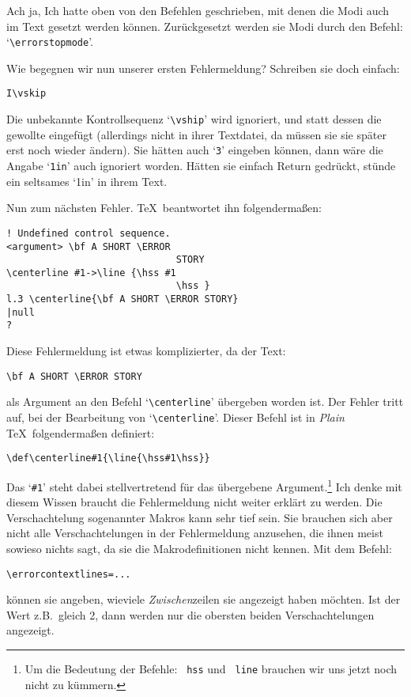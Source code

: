 Ach ja, Ich hatte oben von den Befehlen geschrieben, mit denen die
Modi auch im Text gesetzt werden k\"onnen. Zur\"uckgesetzt werden sie
Modi durch den Befehl: 
`\verb|\errorstopmode|'.

Wie begegnen wir nun unserer ersten Fehlermeldung? Schreiben sie doch
einfach:
\begin{verbatim}
I\vskip
\end{verbatim}
Die unbekannte 
Kontrollsequenz 
`\verb|\vship|' wird ignoriert, und
statt dessen die gewollte eingef\"ugt (allerdings nicht in ihrer
Textdatei, da m\"ussen sie sie sp\"ater erst noch wieder \"andern). Sie
h\"atten auch `\verb|3|' eingeben k\"onnen, dann w\"are die Angabe
`\verb|1in|' auch ignoriert worden. H\"atten sie einfach Return
gedr\"uckt, st\"unde ein seltsames `1in' in ihrem Text.

Nun zum n\"achsten Fehler. \TeX\ beantwortet ihn folgenderma\ss{}en:
\begin{verbatim}
! Undefined control sequence.
<argument> \bf A SHORT \ERROR
                              STORY
\centerline #1->\line {\hss #1
                              \hss }
l.3 \centerline{\bf A SHORT \ERROR STORY}
|null
?
\end{verbatim}
Diese Fehlermeldung ist etwas komplizierter, da der Text:
\begin{verbatim}
\bf A SHORT \ERROR STORY
\end{verbatim}
als 
Argument an den Befehl `\verb|\centerline|' \"ubergeben worden ist.
Der Fehler tritt auf, bei der Bearbeitung von `\verb|\centerline|'.
Dieser Befehl ist in {\em Plain} \TeX\ folgenderma\ss{}en definiert:
\begin{verbatim}
\def\centerline#1{\line{\hss#1\hss}}
\end{verbatim}
Das `\verb|#1|' steht dabei stellvertretend f\"ur das \"ubergebene
Argument.\footnote{Um die Bedeutung der Befehle: {\tt{} hss} und
{\tt{} line} brauchen wir uns jetzt noch nicht zu k\"ummern.} Ich
denke mit diesem Wissen braucht die Fehlermeldung nicht weiter erkl\"art
zu werden. Die Verschachtelung sogenannter
Makros kann sehr tief sein.
Sie brauchen sich aber nicht alle Verschachtelungen in der
Fehlermeldung anzusehen, die ihnen meist sowieso nichts sagt, da sie
die Makrodefinitionen nicht kennen. Mit dem Befehl:
\begin{verbatim}
\errorcontextlines=...
\end{verbatim}
k\"onnen sie angeben, wieviele {\em Zwischen}zeilen sie angezeigt haben
m\"ochten. Ist der Wert z.B.\ gleich 2, dann werden nur die obersten
beiden Verschachtelungen angezeigt.

